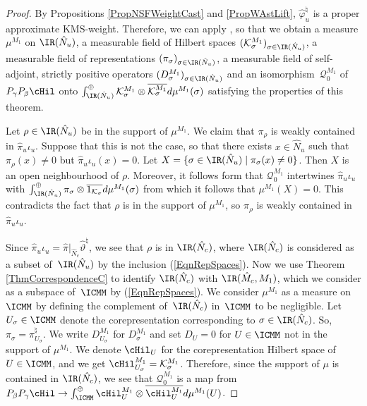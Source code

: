 \begin{proof}
By  Propositions \ref{PropNSFWeightCast} and \ref{PropWAstLift}, $\hat{\varphi}_u^\natural$ is a proper approximate KMS-weight. Therefore, we can apply \cite[Theorem 3.4.5]{Des}, so that we obtain a measure $\mu^{M_1}$ on $\IR(\hat{N}_u)$, a measurable f\/ield of Hilbert spaces $(\mathcal{K}_\sigma^{M_1})_{\sigma \in \IR(\hat{N}_u)}$, a measurable f\/ield of representations $(\pi_\sigma)_{\sigma \in \IR(\hat{N}_u)}$, a measurable f\/ield of self-adjoint, strictly positive operators $(D_\sigma^{M_1})_{\sigma \in \IR(\hat{N}_u)}$ and an isomorphism~$\mathcal{Q}_0^{M_1}$ of $P_\gamma P_\beta \cHil$ onto $\int_{\IR(\hat{N}_u)}^\oplus \mathcal{K}_\sigma^{M_1} \otimes \overline{\mathcal{K}_\sigma^{M_1}} d \mu^{M_1}(\sigma)$ satisfying the properties of this theorem.



Let $\rho \in \IR(\hat{N}_u)$ be in the support of $\mu^{M_1}$.
We claim that $\pi_\rho$ is weakly contained in $\hat{\pi}_u \iota_u$. Suppose that this is not the case, so that there exists $x \in \hat{N}_u$ such that $\pi_\rho(x) \not = 0$ but $\hat{\pi}_u \iota_u(x)  = 0$. Let $X = \{ \sigma \in \IR(\hat{N}_u) \mid \pi_\sigma(x) \not = 0 \}$. Then $X$ is an open neighbourhood of $\rho$. Moreover, it follows form \cite[Theorem 3.4.5]{Des} that $\mathcal{Q}_0^{M_1}$ intertwines $\hat{\pi}_u \iota_u$ with $\int_{\IR(\hat{N}_u)}^\oplus \pi_\sigma \otimes \overline{1_{\mathcal{K}_\sigma}} d\mu^{M_1}(\sigma)$ from which it follows that $\mu^{M_1}(X) = 0$. This contradicts the fact that $\rho$ is in the support of $\mu^{M_1}$, so $\pi_\rho$ is weakly contained in $\hat{\pi}_u \iota_u$.

Since $\hat{\pi}_u \iota_u = \hat{\pi}\vert_{\hat{N}_c} \hat{\vartheta}^\natural$, we see that $\rho$ is in $\IR(\hat{N}_c)$, where $\IR(\hat{N}_c)$ is considered as a subset of~$\IR(\hat{N}_u)$ by the inclusion (\ref{EqnRepSpaces}).
Now we use Theorem \ref{ThmCorrespondenceC} to identify $\IR(\hat{N}_c)$ with $\IR(\hat{M}_c, M_1)$, which we consider as a subspace of~$\ICMM$ by (\ref{EqnRepSpaces}).  We consider $\mu^{M_1}$ as a measure on~$\ICMM$ by def\/ining the complement of~$\IR(\hat{N}_c)$ in~$\ICMM$ to be negligible. Let $U_\sigma \in \ICMM$ denote the corepresentation corresponding to $\sigma \in \IR(\hat{N}_c)$. So,
$
\pi_\sigma = \pi_{U_\sigma}^\natural.
$
We write $D_{U_\sigma}^{M_1}$ for $D_\sigma^{M_1}$ and set $D_U = 0$ for $U \in \ICMM $ not in the support of $\mu^{M_1}$. We denote $\cHil_U$ for the corepresentation Hilbert space of $U \in \ICMM$, and we get $\cHil_{U_\sigma}^{M_1} = \mathcal{K}_\sigma^{M_1}$.  Therefore, since the support of $\mu$ is contained in $\IR(\hat{N}_c)$, we see that $\mathcal{Q}_0^{M_1}$ is a map from $P_\beta P_\gamma \cHil \rightarrow \int^\oplus_{\ICMM} \cHil_U^{M_1} \otimes \overline{\cHil_U^{M_1}} d\mu^{M_1}(U)$.




\end{proof}
